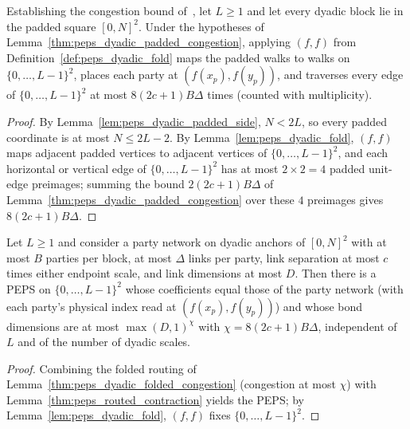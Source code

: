 \begin{lemma}
    \label{thm:peps_dyadic_folded_congestion}
    \leanok
    Establishing the congestion bound of~\cite[Lemma~8.2]{OpenAI2026PolynomialPEPS}, let $L\ge1$ and
    let every dyadic block lie in the padded square $[0,N]^2$.
    Under the hypotheses of Lemma~\ref{thm:peps_dyadic_padded_congestion}, applying $(f,f)$ from Definition~\ref{def:peps_dyadic_fold} maps the padded walks to walks on $\{0,\ldots,L-1\}^2$, places each party at $(f(x_p),f(y_p))$, and traverses every edge of $\{0,\ldots,L-1\}^2$ at most $8(2c+1)B\Delta$ times (counted with multiplicity).
\end{lemma}

\begin{proof}\leanok
    By Lemma~\ref{lem:peps_dyadic_padded_side}, $N<2L$, so every padded coordinate is at most $N\le 2L-2$. By Lemma~\ref{lem:peps_dyadic_fold}, $(f,f)$ maps adjacent padded vertices to adjacent vertices of $\{0,\ldots,L-1\}^2$, and each horizontal or vertical edge of $\{0,\ldots,L-1\}^2$ has at most $2\times 2=4$ padded unit-edge preimages; summing the bound $2(2c+1)B\Delta$ of Lemma~\ref{thm:peps_dyadic_padded_congestion} over these $4$ preimages gives $8(2c+1)B\Delta$.
\end{proof}

\begin{lemma}
    \label{thm:peps_dyadic_routing_peps}
    \leanok
    Let $L\ge1$ and consider a party network on dyadic anchors of $[0,N]^2$
    with at most $B$ parties per block, at most $\Delta$ links per party,
    link separation at most $c$ times either endpoint scale, and link dimensions
    at most $D$. Then there is a PEPS on $\{0,\ldots,L-1\}^2$ whose
    coefficients equal those of the party network (with each party's physical index read at $(f(x_p),f(y_p))$) and whose bond dimensions are at most ${\max(D,1)}^{\chi}$ with $\chi=8(2c+1)B\Delta$, independent of $L$ and of the number of dyadic scales.
\end{lemma}

\begin{proof}\leanok
    Combining the folded routing of Lemma~\ref{thm:peps_dyadic_folded_congestion} (congestion at most $\chi$) with Lemma~\ref{thm:peps_routed_contraction} yields the PEPS; by Lemma~\ref{lem:peps_dyadic_fold}, $(f,f)$ fixes $\{0,\ldots,L-1\}^2$.
\end{proof}

